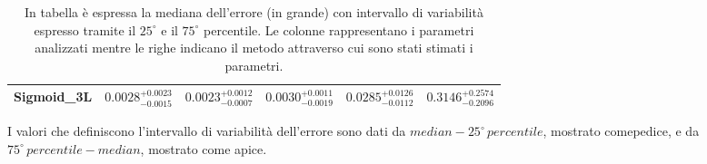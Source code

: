\documentclass[12pt,a4paper,final]{book}
\newcommand\xrowht[2][0]{\addstackgap[.5\dimexpr#2\relax]{\vphantom{#1}}}
\begin{document}
\begin{table}[!ht]
\begin{adjustbox}{center}
\begin{tabular}{|| c || c | c | c | c | c||}
	\hline\xrowht[()]{20pt}
	\textbf{Sigmoid\_3L} & $0.0028_{-0.0015}^{+0.0023}$ & $0.0023_{-0.0007}^{+0.0012}$ & $0.0030_{-0.0019}^{+0.0011}$ & $0.0285_{-0.0112}^{+0.0126}$ & $0.3146_{-0.2096}^{+0.2574}$\\
	\hline
	\end{tabular}
	\end{adjustbox}
	\caption{In tabella è espressa la mediana dell'errore (in grande) con intervallo di variabilità espresso tramite il $25^\circ$ e il $75^\circ$ percentile. Le colonne rappresentano i parametri analizzati mentre le righe indicano il metodo attraverso cui sono stati stimati i parametri.}
	\label{stats}
\end{table}


I valori che definiscono l'intervallo di variabilità dell'errore sono dati da $median-25^\circ\,percentile$, mostrato comepedice, e da $75^\circ\,percentile-median$, mostrato come apice.
\end{document}
